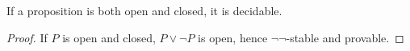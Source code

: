 \begin{corollary}\label{ClopenDecidable}
  If a proposition is both open and closed, it is decidable. 
\end{corollary}
\begin{proof}
  If $P$ is open and closed, %
  $P\vee \neg P$ is open, 
  hence $\neg\neg$-stable and provable. 
%  
\end{proof}



